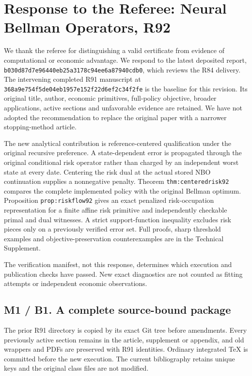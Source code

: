 \hypertarget{response-to-the-referee-neural-bellman-operators-r92}{%
\section{Response to the Referee: Neural Bellman Operators,
R92}\label{response-to-the-referee-neural-bellman-operators-r92}}

We thank the referee for distinguishing a valid certificate from
evidence of computational or economic advantage. We respond to the
latest deposited report,
\nolinkurl{b030d87d7e96440eb25a3178c94ee6a87940cdb0}, which reviews the
R84 delivery. The intervening completed R91 manuscript at
\nolinkurl{368a9e754f5de04eb1957e152f22d6ef2c34f2fe} is the baseline for
this revision. Its original title, author, economic primitives,
full-policy objective, broader applications, active sections and
unfavorable evidence are retained. We have not adopted the
recommendation to replace the original paper with a narrower
stopping-method article.

The new analytical contribution is reference-centered qualification
under the original recursive preference. A state-dependent error is
propagated through the original conditional risk operator rather than
charged by an independent worst state at every date. Centering the risk
dual at the actual stored NBO continuation supplies a nonnegative
penalty. Theorem \texttt{thm:centeredrisk92} compares the complete
implemented policy with the original Bellman optimum. Proposition
\texttt{prop:riskflow92} gives an exact penalized risk-occupation
representation for a finite affine risk primitive and independently
checkable primal and dual witnesses. A strict support-function
inequality excludes risk pieces only on a previously verified error set.
Full proofs, sharp threshold examples and objective-preservation
counterexamples are in the Technical Supplement.

The verification manifest, not this response, determines which execution
and publication checks have passed. New exact diagnostics are not
counted as fitting attempts or independent economic observations.

\hypertarget{m1-b1.-a-complete-source-bound-package}{%
\subsection{M1 / B1. A complete source-bound
package}\label{m1-b1.-a-complete-source-bound-package}}

The prior R91 directory is copied by its exact Git tree before
amendments. Every previously active section remains in the article,
supplement or appendix, and old wrappers and PDFs are preserved with R91
identities. Ordinary integrated TeX is committed before the new
execution. The current bibliography retains unique keys and the original
class files are not modified.

